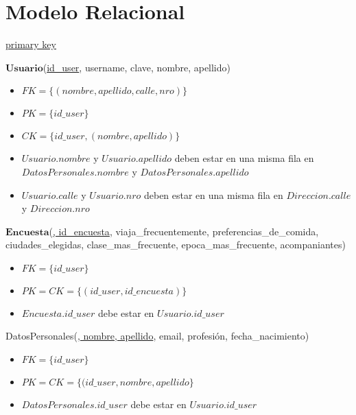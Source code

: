 \section{Modelo Relacional}

\begin{framed} \centering
  \underline{primary key} \hspace*{3cm}
\end{framed}

\vspace*{0.5cm}
\noindent
$\mathbf{Usuario}$(\underline{id\_user}, username, clave, nombre, apellido)
\begin{itemize}
	\item $FK = \{(nombre, apellido, calle, nro)\}$
	\item $PK = \{id\_user\}$
	\item $CK = \{id\_user, (nombre, apellido)\}$
	\item $Usuario.nombre$ y $Usuario.apellido$ deben estar en una misma fila
		en $DatosPersonales.nombre$ y $DatosPersonales.apellido$
	\item $Usuario.calle$ y $Usuario.nro$ deben estar en una misma fila
		en $Direccion.calle$ y $Direccion.nro$

\end{itemize}


\vspace*{0.5cm}
\noindent
$\mathbf{Encuesta}$(\underline{, id\_encuesta},
	viaja\_frecuentemente, preferencias\_de\_comida, ciudades\_elegidas,
	clase\_mas\_frecuente, epoca\_mas\_frecuente, acompaniantes)
\begin{itemize}
	\item $FK = \{id\_user\}$
	\item $PK = CK = \{(id\_user, id\_encuesta)\}$
	\item $Encuesta.id\_user$ debe estar en $Usuario.id\_user$
\end{itemize}

\vspace*{0.5cm}
\noindent
DatosPersonales(\underline{, nombre, apellido}, email,
					profesión, fecha\_nacimiento)
\begin{itemize}
	\item $FK = \{id\_user\}$
	\item $PK = CK = \{(id\_user, nombre, apellido\}$
	\item $DatosPersonales.id\_user$ debe estar en $Usuario.id\_user$
\end{itemize}

